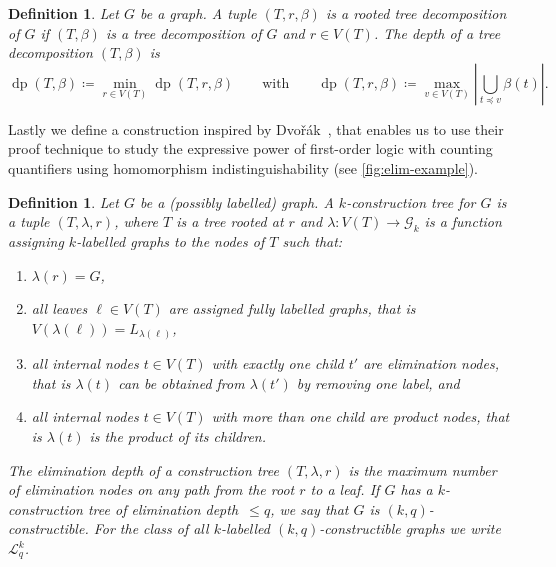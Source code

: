 \documentclass[10pt,a4paper]{article}
\newtheorem{definition}[theorem]{Definition}
\newcommand{\Lkq}{\ensuremath{\mathcal{L}_{q}^{k}}}
\newcommand{\CG}{\ensuremath{\mathcal G}}
\newcommand{\impl}{\ensuremath{\rightarrow}}
\DeclareMathOperator{\dep}{dp}
\newcommand{\elimOrd}[2]{$(#1,#2)$-constructible}
\newcommand{\elimDepth}{elimination depth}
\newcommand{\labels}[1]{\ensuremath{L_{#1}}}
\begin{document}
\begin{definition}
	\label{def:depth-treedec}
	Let $G$ be a graph.
	A tuple $(T,r,\beta)$ is a \emph{rooted tree decomposition} of $G$
	if $(T,\beta)$ is a tree decomposition of $G$ and $r \in V(T)$.
	The \emph{depth of a tree decomposition $(T,\beta)$} is
	\begin{equation*}
		\dep(T,\beta)\coloneqq \min_{r\in V(T)} \dep(T,r,\beta)
		\qquad \text{with}
		\qquad
		\dep(T,r,\beta)\coloneqq \max_{v \in V(T)} \left| \bigcup_{t\preceq v} \beta(t) \right|.
	\end{equation*}
\end{definition}

Lastly we define a construction inspired by Dvo\v{r}\'ak~\cite{dvorak_recognizing_2010}, that enables us to use their proof technique to study the expressive power of first-order logic with counting quantifiers using homomorphism indistinguishability (see \cref{fig:elim-example}).

\begin{definition}
	\label{def:Ekq}
	Let $G$ be a (possibly labelled) graph. A \emph{$k$-construction tree} for $G$ is a tuple $(T,\lambda,r)$, where $T$ is a tree rooted at $r$ and $\lambda\colon V(T)\impl \CG_k$ is a function assigning $k$-labelled graphs to the nodes of $T$ such that:
	\begin{enumerate}
		\item $\lambda(r)=G$, \label{ct1}
		\item all leaves $\ell\in V(T)$ are assigned fully labelled graphs, that is $V(\lambda(\ell))=\labels{\lambda(\ell)}$,
		\item all internal nodes $t\in V(T)$ with exactly one child $t'$ are \emph{elimination nodes}, that is $\lambda(t)$ can be obtained from $\lambda(t')$ by removing one label, and
		\item all internal nodes $t\in V(T)$ with more than one child are \emph{product nodes}, that is $\lambda(t)$ is the product of its children.
	\end{enumerate}
	The \emph{\elimDepth} of a construction tree $(T,\lambda,r)$ is the maximum number of elimination nodes on any path from the root $r$ to a leaf.
	If $G$ has a $k$-construction tree of \elimDepth\ $\leq q$, we say that $G$ is \emph{\elimOrd{k}{q}}.
	For the class of all $k$-labelled \elimOrd{k}{q} graphs we write \Lkq.
\end{definition}
\end{document}
